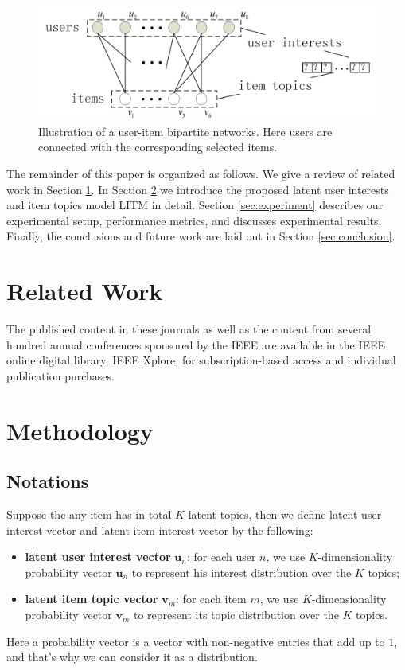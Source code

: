 \documentclass[conference]{IEEEtran}
\begin{document}
\begin{figure}[!ht]
   \centering
   \begin{center}
     \includegraphics*[width=0.8\linewidth]{user-item-bipartite}
   \caption{Illustration of a user-item bipartite networks. Here users are connected with the corresponding selected items.}
   \label{fig:user-item-bipartite}
   \end{center}
\end{figure}




The remainder of this paper is organized as follows. We give a review of related work in Section \ref{sec:relatedwork}. In Section \ref{sec:methodology} we introduce the proposed latent user interests and item topics model LITM in detail. Section \ref{sec:experiment} describes our experimental setup, performance metrics, and discusses experimental results. Finally, the conclusions and future work are laid out in Section \ref{sec:conclusion}.





\section{Related Work}\label{sec:relatedwork}
The published content in these journals as well as the content from several hundred annual conferences sponsored by the IEEE are available in the IEEE online digital library, IEEE Xplore, for subscription-based access and individual publication purchases\cite{bell2007modeling,hofmann1999latent,shen2012learning}.

\section{Methodology}\label{sec:methodology}

\subsection{Notations}
Suppose the any item has in total $K$ latent topics, then we define latent user interest vector and latent item interest vector by the following:
   \begin{itemize}
     \item{{\bf latent user interest vector} $\bm{u}_n$}: for each user $n$, we use $K$-dimensionality probability vector $\bm{u}_n$ to represent his interest distribution over the $K$ topics;
     \item{{\bf latent item topic vector} $\bm{v}_m$}: for each item $m$, we use $K$-dimensionality probability vector $\bm{v}_m$ to represent its topic distribution over the $K$ topics.
   \end{itemize}
Here a probability vector is a vector with non-negative entries that add up to $1$, and that's why we can consider it as a distribution.
\end{document}
